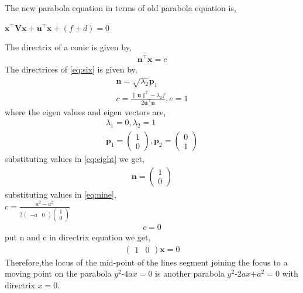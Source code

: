 \documentclass[journal,12pt,twocolumn]{IEEEtran}
\newcommand{\myvec}[1]{\ensuremath{\begin{pmatrix}#1\end{pmatrix}}}
\let\vec\mathbf
\begin{document}
The new parabola equation in terms of old parabola equation is,\\
\begin{center}
$\vec{x}^\top\vec{V}\vec{x}+\vec{u}^\top\vec{x}+(f+d)=0$
\end{center}
The directrix of a conic is given by,
\begin{align}
\label{eq:seven}
\vec{n}^\top\vec{x}=c
\end{align}
The directrices of \eqref{eq:six} is given by,\\
\begin{align}
\vec{n}=\sqrt{\lambda_2}\vec{p}_{1}\\
c=\frac{\|\vec{u}\|^2-\lambda_2 f}{2\vec{u}^\top\vec{n}} , e=1
\end{align}
where the eigen values and eigen vectors are,\\
\begin{align}
\label{eq:eight}
\lambda_1=0 , \lambda_2=1\\
\vec{p}_{1}=\myvec{1\\0}, \vec{p}_{2}=\myvec{0\\1} 
\end{align}
substituting values in \eqref{eq:eight} we get,\\
\begin{align}
\label{eq:nine}
\vec{n}=\myvec{1\\0}
\end{align}
substituting values in \eqref{eq:nine},\\
$c=\frac{a^2-a^2}{2\myvec{-a & 0}\myvec{1\\0}}$\\
\begin{align}
\label{eq:ten}
c=0
\end{align}
put n and c in directrix equation we get,
\begin{align}
\label{eq:eleven}
\myvec{1&0}\vec{x}=0
\end{align}
        Therefore,the locus of the mid-point of the lines segment joining the focus to a moving point on the parabola $y^2$-$4ax=0$ is another parabola $y^2$-$2ax$+$a^2=0$ with directrix $x=0$.\\
\end{document}
